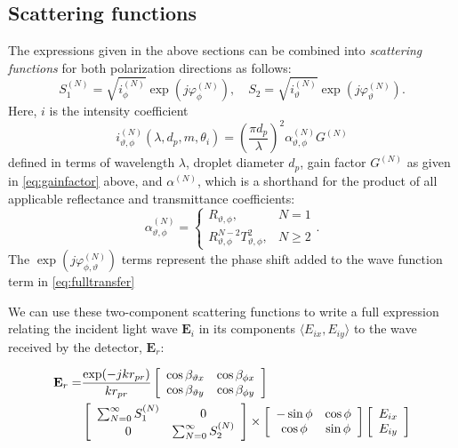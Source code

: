 \documentclass[11.5pt,oneside]{book}
\begin{document}
\subsection{Scattering functions}
The expressions given in the above sections can be combined into
\emph{scattering functions} for both polarization directions as follows:
\begin{equation}
    S_1^{(N)} = \sqrt{i_\phi^{(N)}} \exp(j \varphi_\phi^{(N)}), \quad S_2 =
    \sqrt{i_\vartheta^{(N)}} \exp(j \varphi_\vartheta^{(N)}).
\end{equation}
Here, $i$ is the intensity coefficient
\begin{equation}
    i_{\vartheta,\phi}^{(N)}(\lambda, d_p, m, \theta_i) = \left(\frac{\pi
    d_p}{\lambda}\right)^2 \alpha^{(N)}_{\vartheta,\phi} G^{(N)}
\end{equation}
defined in terms of wavelength $\lambda$, droplet
diameter $d_p$, gain factor $G^{(N)}$ as given in \eqref{eq:gainfactor} above, and
$\alpha^{(N)}$, which is a shorthand for the product of all applicable
reflectance and transmittance coefficients:
\begin{equation}
    \alpha^{(N)}_{\vartheta,\phi} = \begin{cases} R_{\vartheta,\phi}, & N=1
    \\[2ex]
R_{\vartheta,\phi}^{N-2} T_{\vartheta,\phi}^2, & N \geq 2 \end{cases}.
\end{equation}
The $\exp(j \varphi_{\phi,\vartheta}^{(N)})$ terms represent the phase shift
added to the wave function term in \eqref{eq:fulltransfer}

We can use these two-component scattering functions to write a full expression
relating the incident light wave $\mathbf{E}_i$ in its components $\langle E_{ix},
E_{iy} \rangle$ to the wave received by the detector, $\mathbf{E}_r$:

\begin{equation}
  \begin{split}
    \label{eq:fulltransfer}
    {\bf E}_r = &\frac{\exp(-j k r_{pr})}{k r_{pr}}
    \left[ \begin{array}{c c}\cos \beta_{\vartheta x} & \cos \beta_{\phi x} \\
            \cos \beta_{\vartheta y} & \cos \beta_{\phi y} \end{array} \right]
    \\
    &\left[ \begin{array}{c c} \sum_{N=0}^{\infty} S_1^{(N)} & 0 \\
    0 & \sum_{N=0}^{\infty} S_2^{(N)}
  \end{array} \right] \times
\left[ \begin{array}{c c} -\sin \phi & \cos \phi \\ \cos \phi & \sin \phi \end{array} \right]
\left[ \begin{array}{c} E_{ix} \\ E_{iy} \end{array} \right]
\end{split}
\end{equation}
\end{document}
